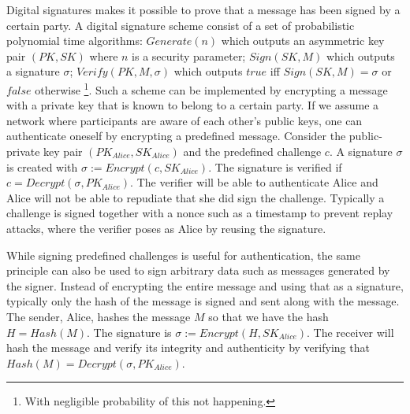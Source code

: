 Digital signatures makes it possible to prove that a message has been signed by a certain party. A digital signature scheme consist of a set of probabilistic polynomial time algorithms: $Generate(n)$ which outputs an asymmetric key pair $(PK, SK)$ where $n$ is a security parameter; $Sign(SK, M)$ which outputs a signature $\sigma$; $Verify(PK, M, \sigma)$ which outputs $true$ iff $Sign(SK, M) = \sigma$ or $false$ otherwise \footnote{With negligible probability of this not happening.}. Such a scheme can be implemented by encrypting a message with a private key that is known to belong to a certain party. If we assume a network where participants are aware of each other's public keys, one can authenticate oneself by encrypting a predefined message. Consider the public-private key pair $(PK_{Alice}, SK_{Alice})$ and the predefined challenge $c$. A signature $\sigma$ is created with $\sigma := Encrypt(c, SK_{Alice})$. The signature is verified if $c=Decrypt(\sigma, PK_{Alice})$. The verifier will be able to authenticate Alice and Alice will not be able to repudiate that she did sign the challenge. Typically a challenge is signed together with a nonce such as a timestamp to prevent replay attacks, where the verifier poses as Alice by reusing the signature.

While signing predefined challenges is useful for authentication, the same principle can also be used to sign arbitrary data such as messages generated by the signer. Instead of encrypting the entire message and using that as a signature, typically only the hash of the message is signed and sent along with the message. The sender, Alice, hashes the message $M$ so that we have the hash $H=Hash(M)$. The signature is $\sigma := Encrypt(H, SK_{Alice})$. The receiver will hash the message and verify its integrity and authenticity by verifying that $Hash(M)=Decrypt(\sigma, PK_{Alice})$.
